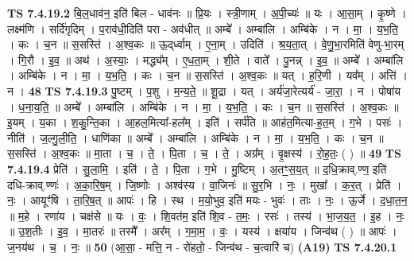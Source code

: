 \documentclass[17pt]{extarticle}
\begin{document}
                  \newline
                                \textbf{ TS 7.4.19.2} \newline
                  बि॒ल॒धाव॑न॒ इति॑ बिल - धाव॑नः ॥ प्रि॒यः । स्त्री॒णाम् । अ॒पी॒च्यः॑ ॥ यः । आ॒सा॒म् । कृ॒ष्णे । लक्ष्म॑णि । सर्दि॑गृदिम् । प॒राव॑धी॒दिति॑ परा - अव॑धीत् ॥ अम्बे᳚ । अम्बा॑लि । अम्बि॑के । न । मा॒ । य॒भ॒ति॒ । कः । च॒न ॥ स॒सस्ति॑ । अ॒श्व॒कः ॥ ऊ॒द्‌र्ध्वाम् । ए॒ना॒म् । उदिति॑ । श्र॒य॒ता॒त् । वे॒णु॒भा॒रमिति॑ वेणु-भा॒रम् । गि॒रौ । इ॒व॒ ॥ अथ॑ । अ॒स्याः॒ । मद्ध्य᳚म् । ए॒ध॒ता॒म् । शी॒ते । वाते᳚ । पु॒नन्न् । इ॒व॒ ॥ अम्बे᳚ । अम्बा॑लि । अम्बि॑के । न । मा॒ । य॒भ॒ति॒ । कः । च॒न ॥ स॒सस्ति॑ । अ॒श्व॒कः ॥ यत् । ह॒रि॒णी । यव᳚म् । अत्ति॑ । न । \textbf{  48} \newline
                  \newline
                                \textbf{ TS 7.4.19.3} \newline
                  पु॒ष्टम् । प॒शु । म॒न्य॒ते॒ ॥ शू॒द्रा । यत् । अर्य॑जा॒रेत्यर्य॑ - जा॒रा॒ । न । पोषा॑य । ध॒ना॒य॒ति॒ ॥ अम्बे᳚ । अम्बा॑लि । अम्बि॑के । न । मा॒ । य॒भ॒ति॒ । कः । च॒न ॥ स॒सस्ति॑ । अ॒श्व॒कः ॥ इ॒यम् । य॒का । श॒कु॒न्ति॒का । आ॒हल॒मित्या᳚-हल᳚म् । इति॑ । सर्प॑ति ॥ आह॑त॒मित्या-ह॒त॒म् । ग॒भे । पसः॑ । नीति॑ । ज॒ल्गु॒ली॒ति॒ । धाणि॑का ॥ अम्बे᳚ । अम्बा॑लि । अम्बि॑के । न । मा॒ । य॒भ॒ति॒ । कः । च॒न ॥ स॒सस्ति॑ । अ॒श्व॒कः ॥ मा॒ता । च॒ । ते॒ । पि॒ता । च॒ । ते॒ । अग्र᳚म् । वृ॒क्षस्य॑ । रो॒ह॒तः॒ ( ) ॥ \textbf{  49} \newline
                  \newline
                                \textbf{ TS 7.4.19.4} \newline
                  प्रेति॑ । सु॒ला॒मि॒ । इति॑ । ते॒ । पि॒ता । ग॒भे । मु॒ष्टिम् । अ॒तꣳ॒॒स॒य॒त् ॥ द॒धि॒क्राव्.ण्ण॒ इति॑ दधि-क्राव्.ण्णः॑ । अ॒का॒रि॒ष॒म् । जि॒ष्णोः । अश्व॑स्य । वा॒जिनः॑ ॥ सु॒र॒भि । नः॒ । मुखा᳚ । क॒र॒त् । प्रेति॑ । नः॒ । आयूꣳ॑षि । ता॒रि॒ष॒त् ॥ आपः॑ । हि । स्थ । म॒यो॒भुव॒ इति॑ मयः - भुवः॑ । ताः । नः॒ । ऊ॒र्जे । द॒धा॒त॒न॒ ॥ म॒हे । रणा॑य । चक्ष॑से ॥ यः । वः॒ । शि॒वत॑म॒ इति॑ शि॒व - त॒मः॒ । रसः॑ । तस्य॑ । भा॒ज॒य॒त॒ । इ॒ह । नः॒ ॥ उ॒श॒तीः । इ॒व॒ । मा॒तरः॑ ॥ तस्मै᳚ । अर᳚म् । ग॒मा॒म॒ । वः॒ । यस्य॑ । क्षया॑य । जिन्व॑थ ( ) ॥ आपः॑ । ज॒नय॑थ । च॒ । नः॒ ॥ \textbf{  50} \newline
                  \newline
                      (आ॒सा॒ - मत्ति॒ न - रो॑हतो॒ - जिन्व॑थ - च॒त्वारि॑ च)  \textbf{(A19)} \newline \newline
                                \textbf{ TS 7.4.20.1} \newline
\end{document}
